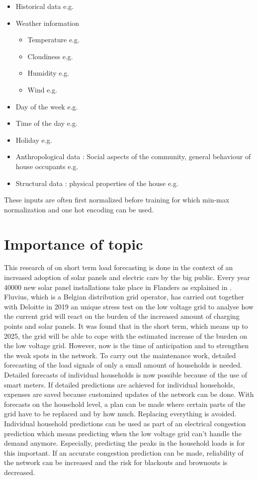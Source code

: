 \begin{itemize}
	\item Historical data e.g. \cite{Kong2019}
	\item Weather information
	\begin{itemize}
		\item Temperature e.g. \cite{Kong2019}
		\item Cloudiness e.g. \cite{Contaxi2006}
		\item Humidity e.g. \cite{Contaxi2006}
		\item Wind e.g. \cite{Charytoniuk1997}
	\end{itemize}
	\item Day of the week e.g. \cite{Kong2019}
	\item Time of the day e.g. \cite{Kong2019}
	\item Holiday e.g. \cite{Kong2019}
	\item Anthropological data : Social aspects of the community, general behaviour of house
	occupants e.g. \cite{Javed2012}
	\item Structural data : physical properties of the house e.g. \cite{Javed2012}
\end{itemize}

These inputs are often first normalized before training for which min-max normalization and one hot encoding can be used.

\section{Importance of topic}
This research of on short term load forecasting is done in the context of an increased adoption of solar panels and electric cars by the big public. Every year 40000 new solar panel installations take place in Flanders as explained in \cite{Lemmens2019}. Fluvius, which is a Belgian distribution grid operator, has carried out together with Deloitte in 2019 an unique stress test on the low voltage grid to analyse how the current grid will react on the burden of the increased amount of charging points and solar panels. It was found that in the short term, which means up to 2025, the grid will be able to cope with the estimated increase of the burden on the low voltage grid. However, now is the time of anticipation and to strengthen the weak spots in the network. To carry out the maintenance work, detailed forecasting of the load signals of only a small amount of households is needed. Detailed forecasts of individual households is now possible because of the use of smart meters. If detailed predictions are achieved for individual households, expenses are saved because customized updates of the network can be done. With forecasts on the household level, a plan can be made where certain parts of the grid have to be replaced and by how much. Replacing everything is avoided. Individual household predictions can be used as part of an electrical congestion prediction which means predicting when the low voltage grid can't handle the demand anymore. Especially, predicting the peaks in the household loads is for this important. If an accurate congestion prediction can be made, reliability of the network can be increased and the risk for blackouts and brownouts is decreased.\\


